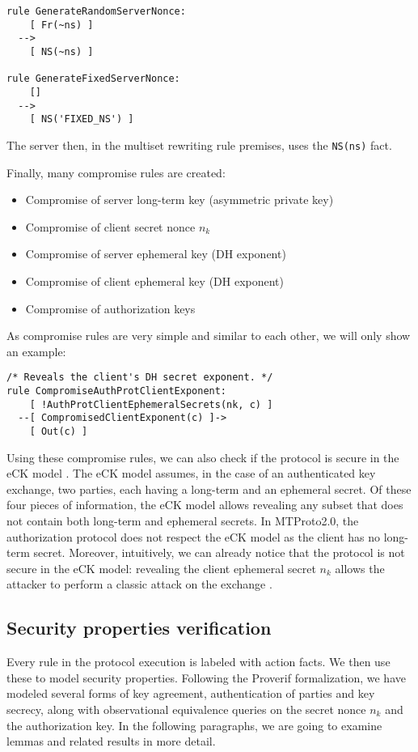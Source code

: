 \begin{lstlisting}
rule GenerateRandomServerNonce:
    [ Fr(~ns) ]
  -->
    [ NS(~ns) ]

rule GenerateFixedServerNonce:
    []
  -->
    [ NS('FIXED_NS') ]
\end{lstlisting}

The server then, in the multiset rewriting rule premises, uses the \lstinline{NS(ns)} fact.

Finally, many compromise rules are created:
\begin{itemize}
  \item Compromise of server long-term key (asymmetric private key)
  \item Compromise of client secret nonce $n_k$
  \item Compromise of server ephemeral key (DH exponent)
  \item Compromise of client ephemeral key (DH exponent)
  \item Compromise of authorization keys
\end{itemize}

As compromise rules are very simple and similar to each other, we will only show an example:

\begin{lstlisting}
/* Reveals the client's DH secret exponent. */
rule CompromiseAuthProtClientExponent:
    [ !AuthProtClientEphemeralSecrets(nk, c) ]
  --[ CompromisedClientExponent(c) ]->
    [ Out(c) ]
\end{lstlisting}

Using these compromise rules, we can also check if the protocol is secure in the eCK model \cite{eCK}. The eCK model assumes, in the case of an authenticated key exchange, two parties, each having a long-term and an ephemeral secret. Of these four pieces of information, the eCK model allows revealing any subset that does not contain both long-term and ephemeral secrets.
In MTProto2.0, the authorization protocol does not respect the eCK model as the client has no long-term secret. Moreover, intuitively, we can already notice that the protocol is not secure in the eCK model: revealing the client ephemeral secret $n_k$ allows the attacker to perform a classic \mitm{} attack on the \DiHe{} exchange \cite{MITM-DH}.

\subsection{Security properties verification}
Every rule in the protocol execution is labeled with action facts. We then use these to model security properties. Following the Proverif formalization, we have modeled several forms of key agreement, authentication of parties and key secrecy, along with observational equivalence queries on the secret nonce $n_k$ and the authorization key. In the following paragraphs, we are going to examine lemmas and related results in more detail.

